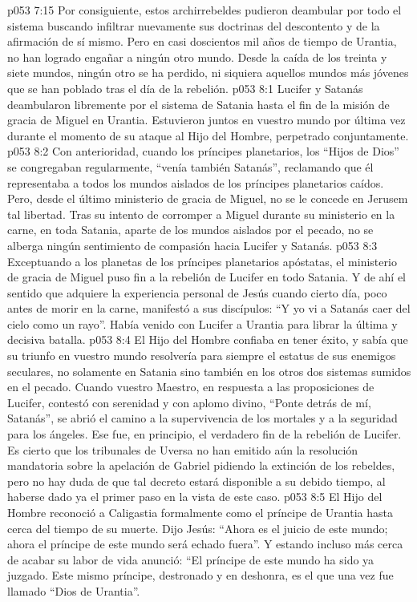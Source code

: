 \vs p053 7:15 Por consiguiente, estos archirrebeldes pudieron deambular por todo el sistema buscando infiltrar nuevamente sus doctrinas del descontento y de la afirmación de sí mismo. Pero en casi doscientos mil años de tiempo de Urantia, no han logrado engañar a ningún otro mundo. Desde la caída de los treinta y siete mundos, ningún otro se ha perdido, ni siquiera aquellos mundos más jóvenes que se han poblado tras el día de la rebelión.
\vs p053 8:1 Lucifer y Satanás deambularon libremente por el sistema de Satania hasta el fin de la misión de gracia de Miguel en Urantia. Estuvieron juntos en vuestro mundo por última vez durante el momento de su ataque al Hijo del Hombre, perpetrado conjuntamente.
\vs p053 8:2 Con anterioridad, cuando los príncipes planetarios, los “Hijos de Dios” se congregaban regularmente, “venía también Satanás”, reclamando que él representaba a todos los mundos aislados de los príncipes planetarios caídos. Pero, desde el último ministerio de gracia de Miguel, no se le concede en Jerusem tal libertad. Tras su intento de corromper a Miguel durante su ministerio en la carne, en toda Satania, aparte de los mundos aislados por el pecado, no se alberga ningún sentimiento de compasión hacia Lucifer y Satanás.
\vs p053 8:3 \pc Exceptuando a los planetas de los príncipes planetarios apóstatas, el ministerio de gracia de Miguel puso fin a la rebelión de Lucifer en todo Satania. Y de ahí el sentido que adquiere la experiencia personal de Jesús cuando cierto día, poco antes de morir en la carne, manifestó a sus discípulos: “Y yo vi a Satanás caer del cielo como un rayo”. Había venido con Lucifer a Urantia para librar la última y decisiva batalla.
\vs p053 8:4 El Hijo del Hombre confiaba en tener éxito, y sabía que su triunfo en vuestro mundo resolvería para siempre el estatus de sus enemigos seculares, no solamente en Satania sino también en los otros dos sistemas sumidos en el pecado. Cuando vuestro Maestro, en respuesta a las proposiciones de Lucifer, contestó con serenidad y con aplomo divino, “Ponte detrás de mí, Satanás”, se abrió el camino a la supervivencia de los mortales y a la seguridad para los ángeles. Ese fue, en principio, el verdadero fin de la rebelión de Lucifer. Es cierto que los tribunales de Uversa no han emitido aún la resolución mandatoria sobre la apelación de Gabriel pidiendo la extinción de los rebeldes, pero no hay duda de que tal decreto estará disponible a su debido tiempo, al haberse dado ya el primer paso en la vista de este caso.
\vs p053 8:5 El Hijo del Hombre reconoció a Caligastia formalmente como el príncipe de Urantia hasta cerca del tiempo de su muerte. Dijo Jesús: “Ahora es el juicio de este mundo; ahora el príncipe de este mundo será echado fuera”. Y estando incluso más cerca de acabar su labor de vida anunció: “El príncipe de este mundo ha sido ya juzgado. Este mismo príncipe, destronado y en deshonra, es el que una vez fue llamado “Dios de Urantia”.
